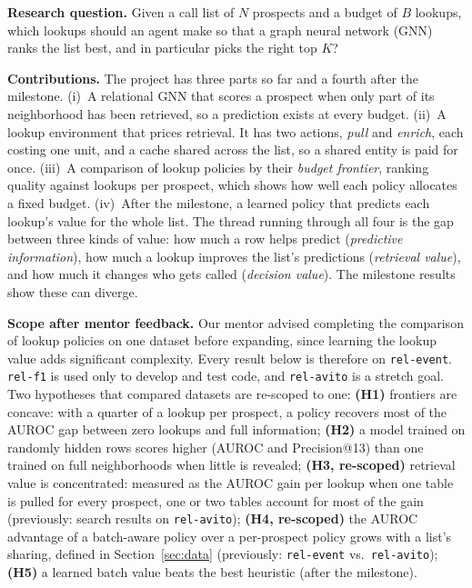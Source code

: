 \documentclass{article}
\begin{document}
\textbf{Research question.} Given a call list of $N$ prospects and a budget of $B$ lookups, which lookups should an agent make so that a graph neural network (GNN) ranks the list best, and in particular picks the right top $K$?

\textbf{Contributions.} The project has three parts so far and a fourth after the milestone. (i)~A relational GNN that scores a prospect when only part of its neighborhood has been retrieved, so a prediction exists at every budget. (ii)~A lookup environment that prices retrieval. It has two actions, \emph{pull} and \emph{enrich}, each costing one unit, and a cache shared across the list, so a shared entity is paid for once. (iii)~A comparison of lookup policies by their \emph{budget frontier}, ranking quality against lookups per prospect, which shows how well each policy allocates a fixed budget. (iv)~After the milestone, a learned policy that predicts each lookup's value for the whole list. The thread running through all four is the gap between three kinds of value: how much a row helps predict (\emph{predictive information}), how much a lookup improves the list's predictions (\emph{retrieval value}), and how much it changes who gets called (\emph{decision value}). The milestone results show these can diverge.

\textbf{Scope after mentor feedback.} Our mentor advised completing the comparison of lookup policies on one dataset before expanding, since learning the lookup value adds significant complexity. Every result below is therefore on \texttt{rel-event}. \texttt{rel-f1} is used only to develop and test code, and \texttt{rel-avito} is a stretch goal. Two hypotheses that compared datasets are re-scoped to one:
\textbf{(H1)} frontiers are concave: with a quarter of a lookup per prospect, a policy recovers most of the AUROC gap between zero lookups and full information;
\textbf{(H2)} a model trained on randomly hidden rows scores higher (AUROC and Precision@13) than one trained on full neighborhoods when little is revealed;
\textbf{(H3, re-scoped)} retrieval value is concentrated: measured as the AUROC gain per lookup when one table is pulled for every prospect, one or two tables account for most of the gain (previously: search results on \texttt{rel-avito});
\textbf{(H4, re-scoped)} the AUROC advantage of a batch-aware policy over a per-prospect policy grows with a list's sharing, defined in Section~\ref{sec:data} (previously: \texttt{rel-event} vs.\ \texttt{rel-avito});
\textbf{(H5)} a learned batch value beats the best heuristic (after the milestone).
\end{document}
